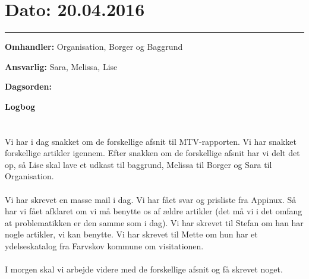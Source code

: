 

\section{Dato: 20.04.2016}
\hrule

\textbf{Omhandler:} Organisation, Borger og Baggrund

\textbf{Ansvarlig:} Sara, Melissa, Lise

\textbf{Dagsorden:}

\textbf{Logbog}
\\
\\ \\
Vi har i dag snakket om de forskellige afsnit til MTV-rapporten. Vi har snakket forskellige artikler igennem. Efter snakken om de forskellige afsnit har vi delt det op, så Lise skal lave et udkast til baggrund, Melissa til Borger og Sara til Organisation. 
\\ \\
Vi har skrevet en masse mail i dag. Vi har fået svar og prisliste fra Appinux. Så har vi fået afklaret om vi må benytte os af ældre artikler (det må vi i det omfang at problematikken er den samme som i dag). 
Vi har skrevet til Stefan om han har nogle artikler, vi kan benytte. 
Vi har skrevet til Mette om hun har et ydelseskatalog fra Farvskov kommune om visitationen. 
\\ \\
I morgen skal vi arbejde videre med de forskellige afsnit og få skrevet noget.  



